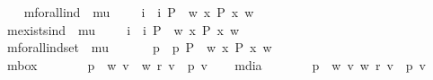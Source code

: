 \begin{isabellebody}
\ \ \isamarkupfalse%
\ mforall{\isacharunderscore}ind\ {\isacharcolon}{\isacharcolon}\ {\isachardoublequoteopen}{\isacharparenleft}mu\ {\isasymRightarrow}\ {\isasymsigma}{\isacharparenright}\ {\isasymRightarrow}\ {\isasymsigma}{\isachardoublequoteclose}\ {\isacharparenleft}{\isachardoublequoteopen}{\isasymforall}i{\isachardoublequoteclose}{\isacharparenright}\ \ {\isachardoublequoteopen}{\isasymforall}i\ P\ {\isacharequal}\ {\isacharparenleft}{\isasymlambda}w{\isachardot}\ {\isasymforall}x{\isachardot}\ P\ x\ w{\isacharparenright}{\isachardoublequoteclose}\ \ \ \isanewline
\ \ \isamarkupfalse%
\ mexists{\isacharunderscore}ind\ {\isacharcolon}{\isacharcolon}\ {\isachardoublequoteopen}{\isacharparenleft}mu\ {\isasymRightarrow}\ {\isasymsigma}{\isacharparenright}\ {\isasymRightarrow}\ {\isasymsigma}{\isachardoublequoteclose}\ {\isacharparenleft}{\isachardoublequoteopen}{\isasymexists}i{\isachardoublequoteclose}{\isacharparenright}\ \ {\isachardoublequoteopen}{\isasymexists}i\ P\ {\isacharequal}\ {\isacharparenleft}{\isasymlambda}w{\isachardot}\ {\isasymexists}x{\isachardot}\ P\ x\ w{\isacharparenright}{\isachardoublequoteclose}\isanewline
\ \ \isamarkupfalse%
\ mforall{\isacharunderscore}indset\ {\isacharcolon}{\isacharcolon}\ {\isachardoublequoteopen}{\isacharparenleft}{\isacharparenleft}mu\ {\isasymRightarrow}\ {\isasymsigma}{\isacharparenright}\ {\isasymRightarrow}\ {\isasymsigma}{\isacharparenright}\ {\isasymRightarrow}\ {\isasymsigma}{\isachardoublequoteclose}\ {\isacharparenleft}{\isachardoublequoteopen}{\isasymforall}p{\isachardoublequoteclose}{\isacharparenright}\ \ {\isachardoublequoteopen}{\isasymforall}p\ P\ {\isacharequal}\ {\isacharparenleft}{\isasymlambda}w{\isachardot}\ {\isasymforall}x{\isachardot}\ P\ x\ w{\isacharparenright}{\isachardoublequoteclose}\isanewline
\ \ \isamarkupfalse%
\ mbox\ {\isacharcolon}{\isacharcolon}\ {\isachardoublequoteopen}{\isasymsigma}\ {\isasymRightarrow}\ {\isasymsigma}{\isachardoublequoteclose}\ {\isacharparenleft}{\isachardoublequoteopen}{\isasymbox}{\isachardoublequoteclose}{\isacharparenright}\ \ {\isachardoublequoteopen}{\isasymbox}\ p\ {\isacharequal}\ {\isacharparenleft}{\isasymlambda}w{\isachardot}\ {\isasymforall}v{\isachardot}\ {\isasymnot}\ w\ r\ v\ {\isasymor}\ p\ v{\isacharparenright}{\isachardoublequoteclose}\isanewline
\ \ \isamarkupfalse%
\ mdia\ {\isacharcolon}{\isacharcolon}\ {\isachardoublequoteopen}{\isasymsigma}\ {\isasymRightarrow}\ {\isasymsigma}{\isachardoublequoteclose}\ {\isacharparenleft}{\isachardoublequoteopen}{\isasymdiamond}{\isachardoublequoteclose}{\isacharparenright}\ \ {\isachardoublequoteopen}{\isasymdiamond}\ p\ {\isacharequal}\ {\isacharparenleft}{\isasymlambda}w{\isachardot}\ {\isasymexists}v{\isachardot}\ w\ r\ v\ {\isasymand}\ p\ v{\isacharparenright}{\isachardoublequoteclose}%

\end{isabellebody}
